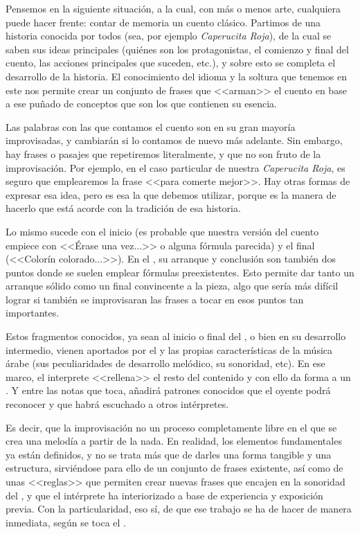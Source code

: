 Pensemos en la siguiente situación, a la cual, con más o menos arte, cualquiera puede hacer frente: contar de memoria un cuento clásico. Partimos de una historia conocida por todos (sea, por ejemplo \emph{Caperucita Roja}), de la cual se saben sus ideas principales (quiénes son los protagonistas, el comienzo y final del cuento, las acciones principales que suceden, etc.), y sobre esto se completa el desarrollo de la historia. El conocimiento del idioma y la soltura que tenemos en este nos permite crear un conjunto de frases que <<arman>> el cuento en base a ese puñado de conceptos que son los que contienen su esencia.

Las palabras con las que contamos el cuento son en su gran mayoría improvisadas, y cambiarán si lo contamos de nuevo más adelante. Sin embargo, hay frases o pasajes que repetiremos literalmente, y que no son fruto de la improvisación. Por ejemplo, en el caso particular de nuestra \emph{Caperucita Roja}, es seguro que emplearemos la frase <<para comerte mejor>>. Hay otras formas de expresar esa idea, pero es esa la que debemos utilizar, porque es la manera de hacerlo que está acorde con la tradición de esa historia.

Lo mismo sucede con el inicio (es probable que nuestra versión del cuento empiece con <<Érase una vez...>> o alguna fórmula parecida) y el final (<<Colorín colorado...>>). En el \taqsimb, su arranque y conclusión son también dos puntos donde se suelen emplear fórmulas preexistentes. Esto permite dar tanto un arranque sólido como un final convincente a la pieza, algo que sería más difícil lograr si también se improvisaran las frases a tocar en esos puntos tan importantes.

Estos fragmentos conocidos, ya sean al inicio o final del \taqsimb, o bien en su desarrollo intermedio, vienen aportados por el \maqam y las propias características de la música árabe (sus peculiaridades de desarrollo melódico, su sonoridad, etc). En ese marco, el interprete <<rellena>> el resto del contenido y con ello da forma a un \taqsimb. Y entre las notas que toca, añadirá patrones conocidos que el oyente podrá reconocer y que habrá escuchado a otros intérpretes.

Es decir, que la improvisación no un proceso completamente libre en el que se crea una melodía a partir de la nada. En realidad, los elementos fundamentales ya están definidos, y no se trata más que de darles una forma tangible y una estructura, sirviéndose para ello de un conjunto de frases existente, así como de unas <<reglas>> que permiten crear nuevas frases que encajen en la sonoridad del \taqsimb, y que el intérprete ha interiorizado a base de experiencia y exposición previa. Con la particularidad, eso sí, de que ese trabajo se ha de hacer de manera inmediata, según se toca el \taqsimb.

